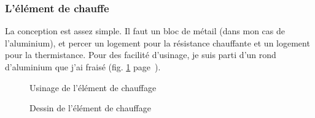 \subsubsection{L'élément de chauffe}%
La conception est assez simple. Il faut un bloc de métail (dans mon cas de l'aluminium), et%
percer un logement pour la résistance chauffante et un logement pour la thermistance.%
Pour des facilité d'usinage, je suis parti d'un rond d'aluminium que j'ai fraisé %
(fig. \ref{usinage_chauffe} page~\pageref{usinage_chauffe}).%
\begin{figure}%
   \caption{\label{usinage_chauffe} Usinage de l'élément de chauffage}%
\end{figure}%
\begin{figure}%
   \caption{\label{sch_chauffe} Dessin de l'élément de chauffage}%
\end{figure}%
